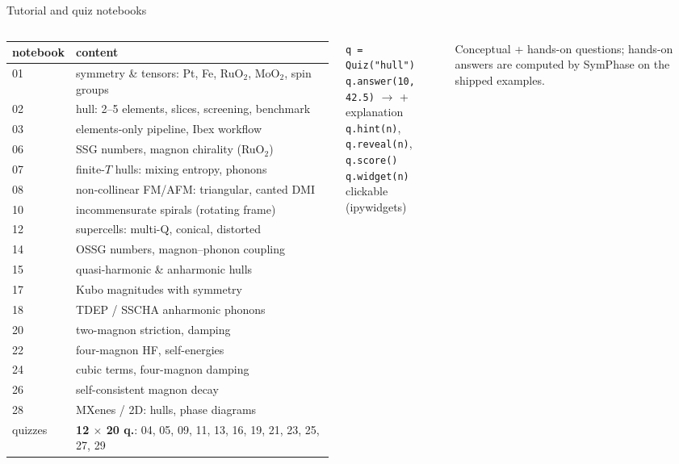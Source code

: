 \documentclass[aspectratio=169,11pt]{beamer}
\begin{document}
\begin{frame}{Tutorial and quiz notebooks}
\begin{columns}[T]
\renewcommand{\arraystretch}{1.25}
{\scriptsize\renewcommand{\arraystretch}{0.74}\begin{tabular}{@{}l>{\raggedright\arraybackslash}p{6.0cm}@{}}
\toprule
notebook & content\\ \midrule
01 & symmetry \& tensors: Pt, Fe, RuO$_2$, MoO$_2$, spin groups \\
02 & hull: 2--5 elements, slices, screening, benchmark\\
03 & elements-only pipeline, Ibex workflow\\
06 & SSG numbers, magnon chirality (RuO$_2$)\\
07 & finite-$T$ hulls: mixing entropy, phonons\\
08 & non-collinear FM/AFM: triangular, canted DMI\\
10 & incommensurate spirals (rotating frame)\\
12 & supercells: multi-Q, conical, distorted\\
14 & OSSG numbers, magnon–phonon coupling\\
15 & quasi-harmonic \& anharmonic hulls\\
17 & Kubo magnitudes with symmetry\\
18 & TDEP / SSCHA anharmonic phonons\\
20 & two-magnon striction, damping\\
22 & four-magnon HF, self-energies\\
24 & cubic terms, four-magnon damping\\
26 & self-consistent magnon decay\\
28 & MXenes / 2D: hulls, phase diagrams\\
quizzes & \textbf{12 $\times$ 20 q.}: 04, 05, 09, 11, 13, 16, 19, 21, 23, 25, 27, 29\\ \bottomrule
\end{tabular}}
\begin{tcolorbox}[sp,title=Self-checking quizzes]
\texttt{q = Quiz("hull")}\\
\texttt{q.answer(10, 42.5)} $\to$ \textcolor{spinc}{\checkmark} + explanation\\
\texttt{q.hint(n)}, \texttt{q.reveal(n)}, \texttt{q.score()}\\
\texttt{q.widget(n)} clickable (ipywidgets)
\end{tcolorbox}
Conceptual + hands-on questions; hands-on answers are computed by SymPhase on the shipped examples.
\end{columns}
\end{frame}
\end{document}

